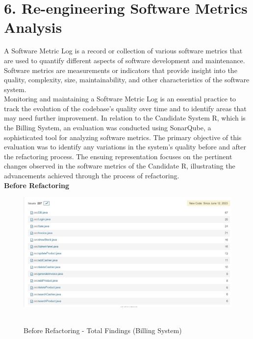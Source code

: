 \documentclass[12pt,letterpaper]{report}
\begin{document}
\section*{6. Re-engineering Software Metrics Analysis}
\normalsize{
A Software Metric Log is a record or collection of various software metrics that are used to quantify different aspects of software development and maintenance. Software metrics are measurements or indicators that provide insight into the quality, complexity, size, maintainability, and other characteristics of the software system.\\

Monitoring and maintaining a Software Metric Log is an essential practice to track the evolution of the codebase's quality over time and to identify areas that may need further improvement. In relation to the Candidate System R, which is the Billing System, an evaluation was conducted using SonarQube, a sophisticated tool for analyzing software metrics. The primary objective of this evaluation was to identify any variations in the system's quality before and after the refactoring process. The ensuing representation focuses on the pertinent changes observed in the software metrics of the Candidate R, illustrating the advancements achieved through the process of refactoring.\\

\textbf{Before Refactoring}

\begin{figure}[h!]
    \centering
    \includegraphics[width=1.0\linewidth]{Images/Before_Refactoring.jpeg}\
    \caption{Before Refactoring - Total Findings (Billing System)}
    \label{fig:enter-label}
    
\end{figure}
\pagebreak

}
\end{document}
